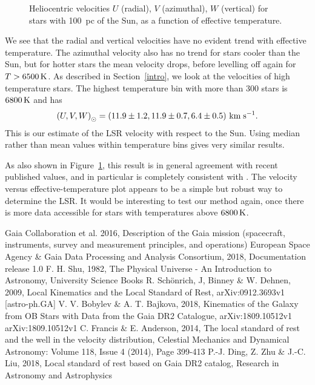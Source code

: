 \documentclass{aastex62}
\begin{document}
	\begin{figure}[ht!]
	\caption{Heliocentric velocities $U$ (radial), $V$ (azimuthal), $W$ (vertical) for stars with 100~pc of the Sun, as a function of effective temperature.\label{fig:lsrmean}}
	\end{figure}

We see that the radial and vertical velocities have no evident trend with effective temperature.  The azimuthal velocity also has no trend for stars cooler than the Sun, but for hotter stars the mean velocity drops, before levelling off again for $T>6500\rm\,K$.  As described in Section~\ref{intro}, we look at the velocities of high temperature stars. The highest temperature bin with more than 300 stars is $6800\rm\,K$ and has
$$ \left( U, V, W\right)_\odot=\left( 11.9\pm1.2, 11.9\pm0.7, 6.4\pm0.5 \right) \rm\,km\;s^{-1}.$$
This is our estimate of the LSR velocity with respect to the Sun.  Using median rather than mean values within temperature bins gives very similar results.

As also shown in Figure~\ref{fig:lsrmean}, this result is in general agreement with recent published values, and in particular is completely consistent with \cite{schoenrich}.  The velocity versus effective-temperature plot appears to be
a simple but robust way to determine the LSR. It would be interesting to test our method again, once there is more data accessible for stars with temperatures above $6800\rm\,K$.


	\begin{thebibliography}{}
		
		 Gaia Collaboration et al. 2016, Description of the Gaia mission (spacecraft, instruments, survey and measurement principles, and operations)
		 European Space Agency \& Gaia Data Processing and Analysis Consortium, 2018, Documentation release 1.0
		 F. H. Shu, 1982, The Physical Universe - An Introduction to Astronomy, University Science Books
		 R. Sch\"{o}nrich, J, Binney \& W. Dehnen, 2009, Local Kinematics and the Local Standard of Rest, arXiv:0912.3693v1 [astro-ph.GA]
		 V. V. Bobylev \& A. T. Bajkova, 2018, Kinematics of the Galaxy from OB Stars with Data from the Gaia DR2 Catalogue, arXiv:1809.10512v1 arXiv:1809.10512v1
		 C. Francis \& E. Anderson, 2014, The local standard of rest and the well in the velocity distribution, Celestial Mechanics and Dynamical Astronomy: Volume 118, Issue 4 (2014), Page 399-413
		 P.-J. Ding, Z. Zhu \& J.-C. Liu, 2018, Local standard of rest based on Gaia DR2 catalog, Research in Astronomy and Astrophysics
		
	\end{thebibliography}
	
\end{document}
